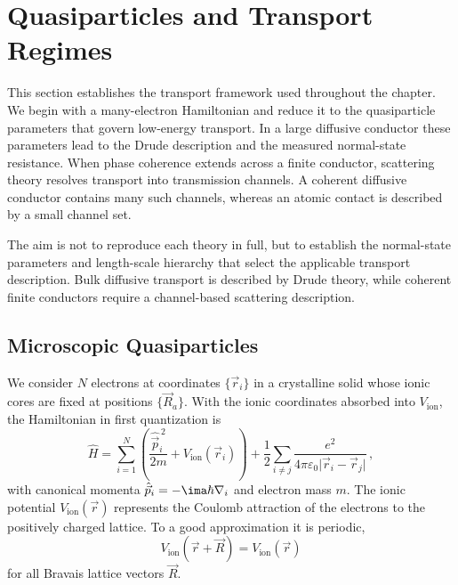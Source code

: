 
\section{Quasiparticles and Transport Regimes}
\label{sec:basics}
    
    This section establishes the transport framework used throughout the chapter. We begin with a many-electron Hamiltonian and reduce it to the quasiparticle parameters that govern low-energy transport. In a large diffusive conductor these parameters lead to the Drude description and the measured normal-state resistance. When phase coherence extends across a finite conductor, scattering theory resolves transport into transmission channels. A coherent diffusive conductor contains many such channels, whereas an atomic contact is described by a small channel set.

    The aim is not to reproduce each theory in full, but to establish the normal-state parameters and length-scale hierarchy that select the applicable transport description. Bulk diffusive transport is described by Drude theory, while coherent finite conductors require a channel-based scattering description. \cite{ashcroft_solid_2012, gross_festkorperphysik_2014}

    \subsection{Microscopic Quasiparticles}
    \label{subsec:basics:micro}

        We consider $N$ electrons at coordinates $\{\vec{r}_i\}$ in a crystalline solid whose ionic cores are fixed at positions $\{\vec{R}_a\}$. With the ionic coordinates absorbed into $V_\text{ion}$, the Hamiltonian in first quantization is
        \begin{equation}
            \hat{H}
            = \sum_{i=1}^N \left(
                \frac{\hat{\vec{p}}^{\,2}_i}{2m}
                + V_\text{ion}(\vec{r}_i)
            \right)
            + \frac{1}{2} \sum_{i \neq j}
            \frac{e^2}{4\pi\varepsilon_0 \lvert \vec{r}_i - \vec{r}_j \rvert}\,,
            \label{eq:micro:full-hamiltonian}
        \end{equation}
        with canonical momenta $\hat{\vec{p}}_i = -\ima\hbar\nabla_i$ and electron mass $m$. The ionic potential $V_\text{ion}(\vec{r})$ represents the Coulomb attraction of the electrons to the positively charged lattice. To a good approximation it is periodic,
        \begin{equation}
            V_\text{ion}(\vec{r} + \vec{R})
            = V_\text{ion}(\vec{r})
            \label{eq:basics:ionic-periodicity}
        \end{equation}
        for all Bravais lattice vectors $\vec{R}$.

